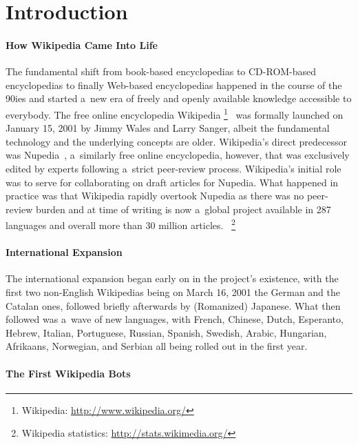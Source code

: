 \documentclass{sig-alternate}
\newcommand{\inlinelistingsize}{\fontsize{8pt}{11pt}}
\let\oldurl\url
\renewcommand{\url}[1]{\inlinelistingsize\oldurl{#1}}
\begin{document}
\section{Introduction}

\paragraph{How Wikipedia Came Into Life}

The fundamental shift from book-based encyclopedias
to CD-ROM-based encyclopedias
to finally Web-based encyclopedias
happened in the course of the 90ies
and started a~new era of freely and openly
available knowledge accessible to everybody.
The free online encyclopedia Wikipedia%
\footnote{Wikipedia: \url{http://www.wikipedia.org/}}~\cite{sanger05historywikipedia} was formally launched
on January 15, 2001 by Jimmy Wales
and Larry Sanger,
albeit the fundamental technology and the underlying concepts are older.
Wikipedia's direct predecessor was Nupedia~\cite{sanger05historywikipedia},
a~similarly free online encyclopedia,
however, that was exclusively edited by experts
following a~strict peer-review process.
Wikipedia's initial role was to serve
for collaborating on draft articles for Nupedia.
What happened in practice was that Wikipedia rapidly overtook Nupedia
as there was no peer-review burden
and at time of writing is now a~global project
available in 287 languages and overall more than 30 million articles.%
~\footnote{Wikipedia statistics: \url{http://stats.wikimedia.org/}}

\paragraph{International Expansion}

The international expansion began early on
in the project's existence,
with the first two non-English Wikipedias
being on March 16, 2001 the German and the Catalan ones,
followed briefly afterwards by (Romanized) Japanese.
What then followed was a~wave of new languages,
with French, Chinese, Dutch, Esperanto, Hebrew,
Italian, Portuguese, Russian, Spanish, Swedish,
Arabic, Hungarian, Afrikaans, Norwegian, and Serbian all being rolled out in the first year.

\paragraph{The First Wikipedia Bots}
\end{document}
